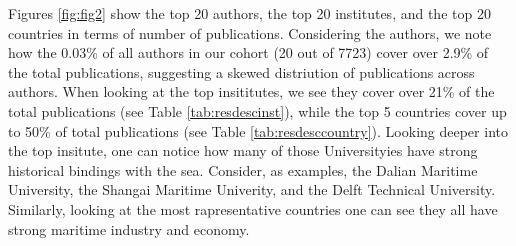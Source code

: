 \documentclass[a4paper, review, endfloat, authoryear]{elsarticle}
\begin{document}
	Figures \ref{fig:fig2} show the top 20 authors, the top 20 institutes, and the top 20 countries in terms of number of publications. Considering the authors, we note how the 0.03\% of all authors in our cohort (20 out of 7723) cover over 2.9\% of the total publications, suggesting a skewed distriution of publications across authors. When looking at the top insititutes, we see they cover over 21\% of the total publications (see Table \ref{tab:resdescinst}), while the top 5 countries cover up to 50\% of total publications (see Table \ref{tab:resdesccountry}). Looking deeper into the top insitute, one can notice how many of those Universityies have strong historical bindings with the sea. Consider, as examples, the Dalian Maritime University, the Shangai Maritime Univerity, and the Delft Technical University. Similarly, looking at the most rapresentative countries one can see they all have strong maritime industry and economy.
	
\end{document}
